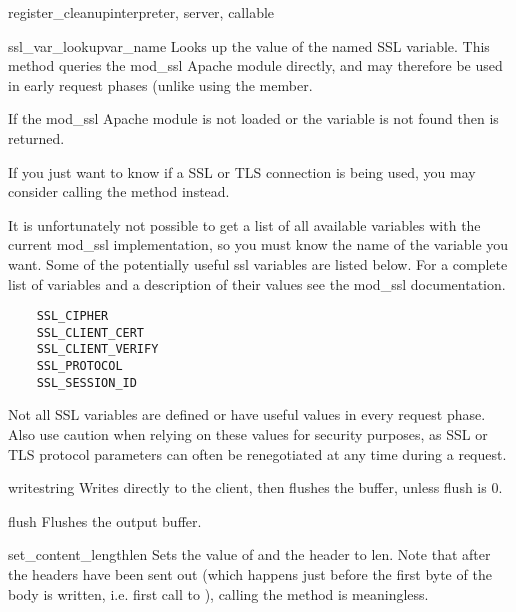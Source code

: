\begin{funcdesc}{register_cleanup}{interpreter, server, callable}
\begin{methoddesc}[request]{ssl_var_lookup}{var_name}
  Looks up the value of the named SSL variable.  This method queries
  the mod_ssl Apache module directly, and may therefore be used in
  early request phases (unlike using the  member.

  If the mod_ssl Apache module is not loaded or the variable is not
  found then  is returned.

  If you just want to know if a SSL or TLS connection is being used,
  you may consider calling the  method instead.

  It is unfortunately not possible to get a list of all available
  variables with the current mod_ssl implementation, so you must know
  the name of the variable you want.  Some of the potentially useful
  ssl variables are listed below.  For a complete list of variables
  and a description of their values see the mod_ssl documentation.

  \begin{verbatim}
    SSL_CIPHER
    SSL_CLIENT_CERT
    SSL_CLIENT_VERIFY
    SSL_PROTOCOL
    SSL_SESSION_ID
  \end{verbatim}

  \begin{notice}
  Not all SSL variables are defined or have useful values in every
  request phase.  Also use caution when relying on these values for
  security purposes, as SSL or TLS protocol parameters can often be
  renegotiated at any time during a request.
  \end{notice}

\end{methoddesc}

\begin{methoddesc}[request]{write}{string}
  Writes  directly to the client, then flushes the buffer,
  unless flush is 0.
\end{methoddesc}

\begin{methoddesc}[request]{flush}{}
  Flushes the output buffer.
\end{methoddesc}

\begin{methoddesc}[request]{set_content_length}{len}
  Sets the value of  and the 
  header to len. Note that after the headers have been sent out (which
  happens just before the first byte of the body is written,
  i.e. first call to ), calling the method is
  meaningless.
\end{methoddesc}



\end{funcdesc}

